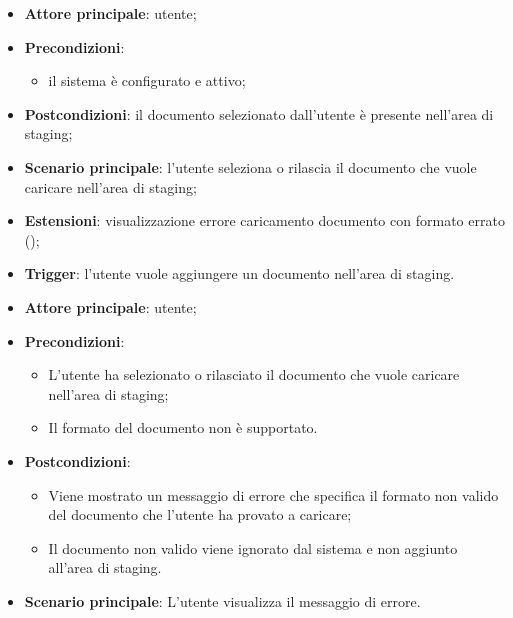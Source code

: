 \documentclass[10pt, a4paper]{article}
\begin{document}
    \begin{itemize}
        \item \textbf{Attore principale}: utente;
        \item \textbf{Precondizioni}:
            \begin{itemize}
                \item il sistema è configurato e attivo;
            \end{itemize}
        \item \textbf{Postcondizioni}: il documento selezionato dall’utente è presente nell’area di staging;
        \item \textbf{Scenario principale}: l’utente seleziona o rilascia il documento che vuole caricare nell’area di staging;
        \item \textbf{Estensioni}: visualizzazione errore caricamento documento con formato errato ();
        \item \textbf{Trigger}: l’utente vuole aggiungere un documento nell’area di staging.
    \end{itemize}

    \begin{itemize}
        \item \textbf{Attore principale}: utente;
        \item \textbf{Precondizioni}:
            \begin{itemize}
                \item L’utente ha selezionato o rilasciato il documento che vuole caricare nell’area di staging;
                \item Il formato del documento non è supportato.
            \end{itemize}
        \item \textbf{Postcondizioni}:
            \begin{itemize}
                \item Viene mostrato un messaggio di errore che specifica il formato non valido del documento che l'utente ha provato a caricare;
                \item Il documento non valido viene ignorato dal sistema e non aggiunto all’area di staging.
            \end{itemize}
        \item \textbf{Scenario principale}: L’utente visualizza il messaggio di errore.
    \end{itemize}
\end{document}
